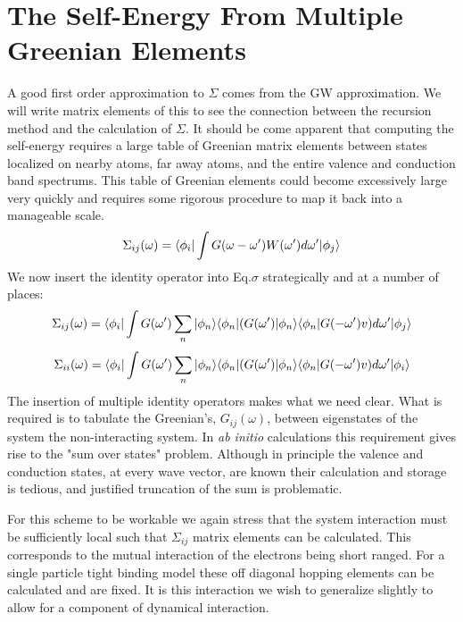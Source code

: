 \section{The Self-Energy From Multiple Greenian Elements}
  A good first order approximation to $\Sigma$ comes from the GW approximation.
We will write matrix elements of this to see the connection between the
recursion method and the calculation of $\Sigma$. It should be come apparent that computing
the self-energy requires a large table of Greenian matrix elements between states localized
on nearby atoms, far away atoms, and the entire valence and conduction band spectrums. 
This table of Greenian elements could become excessively large very quickly and requires some
rigorous procedure to map it back into a manageable scale.
%
\begin{equation}
\label{eq:sigma}
\Sigma_{ij}(\omega) = \langle\phi_{i}|\int G(\omega-\omega')W(\omega')d\omega'|\phi_{j}\rangle
\end{equation}
%
We now insert the identity operator into Eq.$\sigma$ strategically and at a number of places:
%
\begin{equation}
\label{eq:sigma}
\Sigma_{ij}(\omega) = \langle\phi_{i}|\int G(\omega')\sum_{n}|\phi_{n}\rangle\langle\phi_{n}|(G(\omega')|\phi_{n}\rangle\langle\phi_{n}|G(-\omega')v)d\omega'|\phi_{j}\rangle
\end{equation}
%
\begin{equation}
\label{eq:sigma_onsite}%
\Sigma_{ii}(\omega) = \bra\phi_{i}|\int G(\omega')\sum_{n}|\phi_{n}\ket\bra\phi_{n}|(G(\omega')|\phi_{n}\ket\bra\phi_{n}|G(-\omega')v)d\omega'|\phi_{i}\ket
\end{equation}
%
The insertion of multiple identity operators makes what we need clear. What is required 
is to tabulate the Greenian's, $G_{ij}(\omega)$, between eigenstates of the system
the non-interacting system. In {\it ab initio} calculations this requirement 
gives rise to the "sum over states" problem. Although in principle the valence
and conduction states, at every wave vector, are known their calculation and storage
is tedious, and justified truncation of the sum is problematic.

For this scheme to be workable we again stress that the system interaction
must be sufficiently local such that $\Sigma_{ij}$ matrix elements can be
calculated. This corresponds to the mutual interaction of the electrons being 
short ranged. For a single particle tight binding model these off diagonal hopping
elements can be calculated and are fixed. It is this interaction we wish
to generalize slightly to allow for a component of dynamical interaction.
